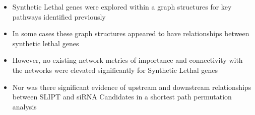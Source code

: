  \begin{itemize}
   \item Synthetic Lethal genes were explored within a \gls{graph} structures for key pathways identified previously 
   
   \bigskip
   
   \item In some cases these \gls{graph} structures appeared to have relationships between \gls{synthetic lethal} genes  
   
   \bigskip
   
   \item However, no existing network metrics of importance and connectivity with the networks were elevated significantly for Synthetic Lethal genes
   
   \bigskip
   
   \item Nor was there significant evidence of upstream and downstream relationships between SLIPT and \gls{siRNA} Candidates in a \gls{shortest path} permutation analysis
  \end{itemize}
  
\clearpage
\fi